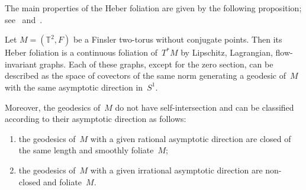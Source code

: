 \documentclass[AHL,Unicode,longabstracts,published]{cedram}
\newcommand{\Z}{\mathbb{Z}}
\newcommand{\R}{\mathbb{R}}
\newcommand{\T}{\mathbb{T}}
\newcommand*{\MK}{\mkern 2mu}
\begin{document}
\begin{defi}

\end{defi}

The main properties of the Heber foliation are given by the following proposition; see~\cite{AABZ15,Ba88,BP86,He32,Ma91,MS11} and~\cite{Sch15}.

\begin{prop}\label{prop:Hfoliation}
Let $M=(\T^2,F)$ be a Finsler two-torus without conjugate points. Then its Heber foliation is a continuous foliation of~$T^* M$ by Lipschitz, Lagrangian, flow-invariant graphs. Each of these graphs, except for the zero section, can be described as the space of covectors of the same norm generating a geodesic of~$M$ with the same asymptotic direction in~$S^1$.

Moreover, the geodesics of~$M$ do not have self-intersection and can be classified according to their asymptotic direction as follows:
\begin{enumerate}
\item\label{geod1} the geodesics of~$M$ with a given rational asymptotic direction are closed of the same length and smoothly foliate~$M$; 
\item\label{geod2} the geodesics of~$M$ with a given irrational asymptotic direction are non-closed and foliate~$M$. 
\end{enumerate}
\end{prop}
\end{document}

